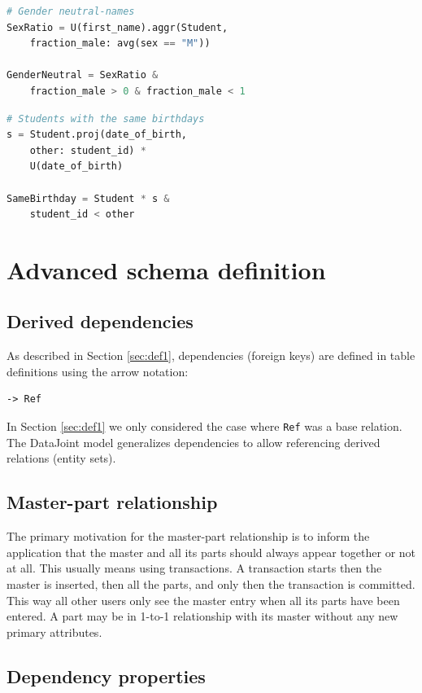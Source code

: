 \documentclass[letter,10pt]{article}
\newcommand{\datajoint}{DataJoint\xspace}
\begin{document}
\begin{lstlisting}[language=Python, morekeywords={avg, U}, caption={Aggregation and restriction.}, label={lst:u3}]
# Gender neutral-names
SexRatio = U(first_name).aggr(Student, 
    fraction_male: avg(sex == "M")) 

GenderNeutral = SexRatio & 
    fraction_male > 0 & fraction_male < 1
\end{lstlisting}

\begin{lstlisting}[language=Python, morekeywords={avg, U}, caption={Elevation of a secondary attribute.}, label={lst:u4} ]
# Students with the same birthdays
s = Student.proj(date_of_birth, 
    other: student_id) * 
    U(date_of_birth)

SameBirthday = Student * s & 
    student_id < other
\end{lstlisting}

\section{Advanced schema definition}\label{sec:def2}
\subsection{Derived dependencies}\label{sec:dep}
As described in Section \ref{sec:def1}, dependencies (foreign keys) are defined in table definitions using the arrow notation:
\begin{lstlisting}
-> Ref
\end{lstlisting}
In Section \ref{sec:def1} we only considered the case where \lstinline$Ref$ was a base relation. 
The \datajoint model generalizes dependencies to allow referencing derived relations (entity sets).

\subsection{Master-part relationship}
The primary motivation for the master-part relationship is to inform the application that the master and all its parts should always appear together or not at all.  
This usually means using transactions.  
A transaction starts then the master is inserted, then all the parts, and only then the transaction is committed.  
This way all other users only see the master entry when all its parts have been entered.
A part may be in 1-to-1 relationship with its master without any new primary attributes.

\subsection{Dependency properties}
\end{document}
